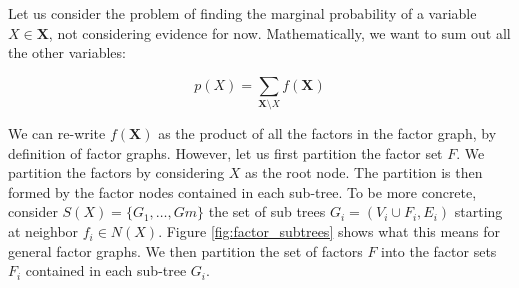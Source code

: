\noindent
Let us consider the problem of finding the marginal probability
of a variable $X \in \textbf{X}$, not considering evidence for now.
Mathematically, we want to sum out all the other variables:

\begin{equation}\label{eq:factor_marg}
p(X) = \sum_{\textbf{X}\setminus X}f(\textbf{X})
\end{equation}

\noindent
We can re-write $f(\textbf{X})$ as the product of all the factors
in the factor graph, by definition of factor graphs. However, let
us first partition the factor set $F$. We partition the factors
by considering $X$ as the root node. The partition is then formed
by the factor nodes contained in each sub-tree.
To be more concrete, consider $S(X) = \{G_1, \dots, Gm\}$ the set
of sub trees $G_i = ( V_i \cup F_i, E_i)$ starting at neighbor 
$f_i \in N(X)$. Figure
\ref{fig:factor_subtrees} shows what this means for general factor graphs.
We then partition the set of factors $F$ into the factor sets $F_i$ 
contained in each sub-tree $G_i$. 

